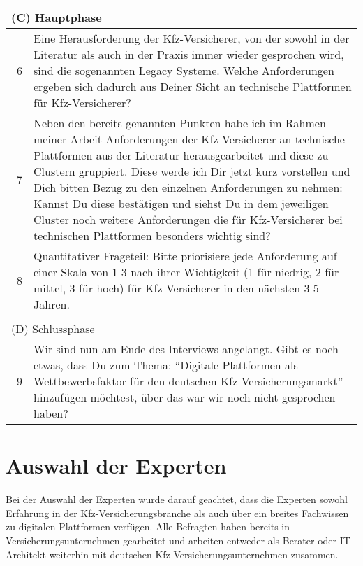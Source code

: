 \begin{table}[H]
\begin{tabularx}{\linewidth}{lX}
\multicolumn{2}{l}{(C) Hauptphase} \\\hline \hline
    \  6 & Eine Herausforderung der Kfz-Versicherer, von der sowohl in der Literatur als auch in der Praxis immer wieder gesprochen wird, sind die sogenannten Legacy Systeme. Welche Anforderungen ergeben sich dadurch aus Deiner Sicht an technische Plattformen für Kfz-Versicherer? \\\hline
    \  7 & Neben den bereits genannten Punkten habe ich im Rahmen meiner Arbeit Anforderungen der Kfz-Versicherer an technische Plattformen aus der Literatur herausgearbeitet und diese zu Clustern gruppiert. Diese werde ich Dir jetzt kurz vorstellen und Dich bitten Bezug zu den einzelnen Anforderungen zu nehmen: Kannst Du diese bestätigen und siehst Du in dem jeweiligen Cluster noch weitere Anforderungen die für Kfz-Versicherer bei technischen Plattformen besonders wichtig sind? \\\hline       
    \  8 & Quantitativer Frageteil: Bitte priorisiere jede Anforderung auf einer Skala von 1-3 nach ihrer Wichtigkeit (1 für niedrig, 2 für mittel, 3 für hoch) für Kfz-Versicherer in den nächsten 3-5 Jahren. \\\hline
    \\
    \multicolumn{2}{l}{(D) Schlussphase}  \\\hline \hline
    \  9 & Wir sind nun am Ende des Interviews angelangt. Gibt es noch etwas, dass Du zum Thema: \enquote{Digitale Plattformen als Wettbewerbsfaktor für den deutschen Kfz-Versicherungsmarkt} hinzufügen möchtest, über das war wir noch nicht gesprochen haben? \\\hline
\end{tabularx}
\end{table} 

\section{Auswahl der Experten}
Bei der Auswahl der Experten wurde darauf geachtet, dass die Experten sowohl Erfahrung in der Kfz-Versicherungsbranche als auch über ein breites Fachwissen zu digitalen Plattformen verfügen. Alle Befragten haben bereits in Versicherungsunternehmen gearbeitet und arbeiten entweder als Berater oder IT-Architekt weiterhin mit deutschen Kfz-Versicherungsunternehmen zusammen.

